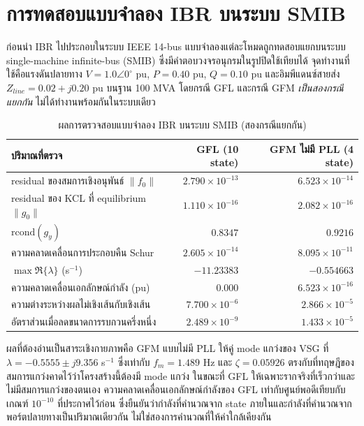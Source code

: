 \documentclass[12pt,a4paper]{article}
\newcommand{\tablefont}{\fontsize{15}{17.2}\selectfont}
\newcommand{\tableheader}{\bfseries}
\begin{document}
\section{การทดสอบแบบจำลอง IBR บนระบบ SMIB}
ก่อนนำ IBR ไปประกอบในระบบ IEEE 14-bus แบบจำลองแต่ละโหมดถูกทดสอบแยกบนระบบ single-machine infinite-bus (SMIB) ซึ่งมีคำตอบวงจรอนุกรมในรูปปิดใช้เทียบได้ จุดทำงานที่ใช้คือแรงดันปลายทาง $V=1.0\angle0^{\circ}$ pu, $P=0.40$ pu, $Q=0.10$ pu และอิมพีแดนซ์สายส่ง $Z_{line}=0.02+j0.20$ pu บนฐาน 100 MVA โดยกรณี GFL และกรณี GFM \emph{เป็นสองกรณีแยกกัน} ไม่ได้ทำงานพร้อมกันในระบบเดียว
\begin{table}[H]
\begin{center}
\tablefont
\caption{ผลการตรวจสอบแบบจำลอง IBR บนระบบ SMIB (สองกรณีแยกกัน)}
\label{tab:smib}
\begin{tabularx}{0.99\textwidth}{@{}L r r@{}}
\toprule
\tableheader ปริมาณที่ตรวจ & GFL (10 state) & GFM ไม่มี PLL (4 state) \\
\midrule
residual ของสมการเชิงอนุพันธ์ $\|f_0\|$ & $2.790\times10^{-13}$ & $6.523\times10^{-14}$ \\
residual ของ KCL ที่ equilibrium $\|g_0\|$ & $1.110\times10^{-16}$ & $2.082\times10^{-16}$ \\
$\mathrm{rcond}(g_y)$ & $0.8347$ & $0.9216$ \\
ความคลาดเคลื่อนการประกอบคืน Schur & $2.605\times10^{-14}$ & $8.095\times10^{-11}$ \\
$\max\Re\{\lambda\}$ (s$^{-1}$) & $-11.23383$ & $-0.554663$ \\
ความคลาดเคลื่อนเอกลักษณ์กำลัง (pu) & $0.000$ & $6.523\times10^{-16}$ \\
ความต่างระหว่างผลไม่เชิงเส้นกับเชิงเส้น & $7.700\times10^{-6}$ & $2.866\times10^{-5}$ \\
อัตราส่วนเมื่อลดขนาดการรบกวนครึ่งหนึ่ง & $2.489\times10^{-9}$ & $1.433\times10^{-5}$ \\
\bottomrule
\end{tabularx}
\end{center}
\end{table}

ผลที่ต้องอ่านเป็นสาระเชิงกายภาพคือ GFM แบบไม่มี PLL ให้คู่ mode แกว่งของ VSG ที่ $\lambda=-0.5555\pm j9.356$ s$^{-1}$ ซึ่งเท่ากับ $f_m=1.489$ Hz และ $\zeta=0.05926$ ตรงกับที่ทฤษฎีของสมการแกว่งคาดไว้ว่าโครงสร้างนี้ต้องมี mode แกว่ง ในขณะที่ GFL ให้เฉพาะรากจริงที่เร็วกว่าและไม่มีสมการแกว่งของตนเอง ความคลาดเคลื่อนเอกลักษณ์กำลังของ GFL เท่ากับศูนย์พอดีเทียบกับเกณฑ์ $10^{-10}$ ที่ประกาศไว้ก่อน ซึ่งยืนยันว่ากำลังที่คำนวณจาก state ภายในและกำลังที่คำนวณจากพอร์ตปลายทางเป็นปริมาณเดียวกัน ไม่ใช่สองการคำนวณที่ให้ค่าใกล้เคียงกัน
\end{document}
